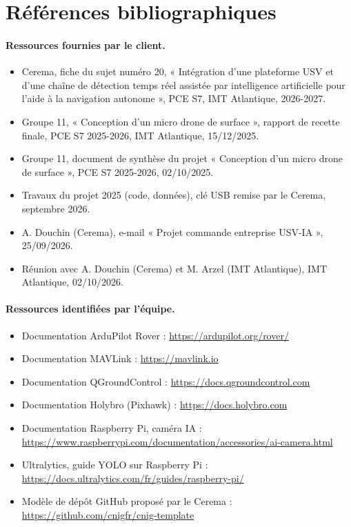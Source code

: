 \section{Références bibliographiques}
\label{sec:bibliographie}

\paragraph{Ressources fournies par le client.}
\begin{itemize}
  \item Cerema, fiche du sujet numéro 20, « Intégration d'une plateforme USV et d'une chaîne de détection temps réel assistée par intelligence artificielle pour l'aide à la navigation autonome », PCE S7, IMT Atlantique, 2026-2027.
  \item Groupe 11, « Conception d'un micro drone de surface », rapport de recette finale, PCE S7 2025-2026, IMT Atlantique, 15/12/2025.
  \item Groupe 11, document de synthèse du projet « Conception d'un micro drone de surface », PCE S7 2025-2026, 02/10/2025.
  \item Travaux du projet 2025 (code, données), clé USB remise par le Cerema, septembre 2026.
  \item A. Douchin (Cerema), e-mail « Projet commande entreprise USV-IA », 25/09/2026.
  \item Réunion avec A. Douchin (Cerema) et M. Arzel (IMT Atlantique), IMT Atlantique, 02/10/2026.
\end{itemize}

\paragraph{Ressources identifiées par l'équipe.}
\begin{itemize}
  \item Documentation ArduPilot Rover : \url{https://ardupilot.org/rover/}
  \item Documentation MAVLink : \url{https://mavlink.io}
  \item Documentation QGroundControl : \url{https://docs.qgroundcontrol.com}
  \item Documentation Holybro (Pixhawk) : \url{https://docs.holybro.com}
  \item Documentation Raspberry Pi, caméra IA : \url{https://www.raspberrypi.com/documentation/accessories/ai-camera.html}
  \item Ultralytics, guide YOLO sur Raspberry Pi : \url{https://docs.ultralytics.com/fr/guides/raspberry-pi/}
  \item Modèle de dépôt GitHub proposé par le Cerema : \url{https://github.com/cnigfr/cnig-template}
\end{itemize}
